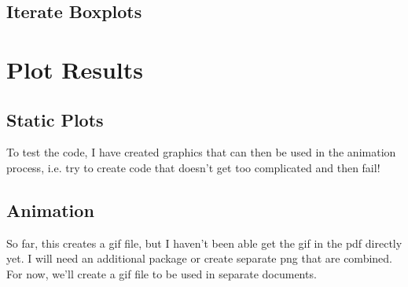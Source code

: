 \documentclass{article}\usepackage[]{graphicx}\usepackage[]{color}
\begin{document}
\subsection{Iterate Boxplots}



\section{Plot Results}

\subsection{Static Plots}

To test the code, I have created graphics that can then be used in the animation process, i.e. try to create code that doesn't get too complicated and then fail! 



\subsection{Animation}

So far, this creates a gif file, but I haven't been able get the gif in the pdf directly yet. I will need an additional package or create separate png that are combined. For now, we'll create a gif file to be used in separate documents. 
\end{document}
